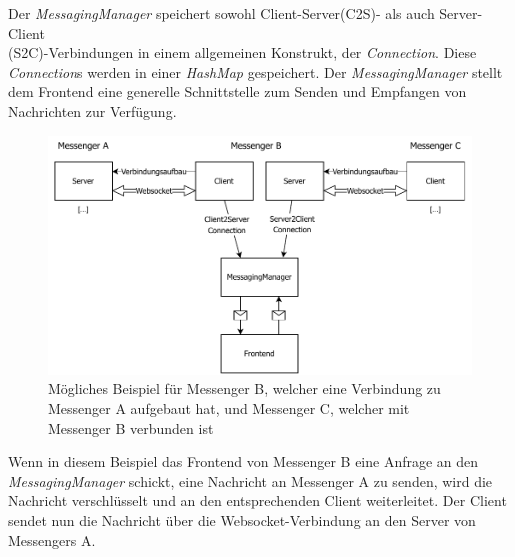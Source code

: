 \documentclass[a4paper,ngerman, headheight=28pt,12pt, footheight=27pt]{scrartcl}
\begin{document}
Der \textit{MessagingManager} speichert sowohl Client-Server(C2S)- als auch Server-Client\\(S2C)-Verbindungen in einem allgemeinen Konstrukt, der \textit{Connection}. Diese \textit{Connection}s werden in einer \textit{HashMap} gespeichert. Der \textit{MessagingManager} stellt dem Frontend eine generelle Schnittstelle zum Senden und Empfangen von Nachrichten zur Verfügung.
\begin{figure}[H]
  \centering
  \includegraphics[width=\textwidth]{diagrams/messaging_messenger.pdf}
  \caption{Mögliches Beispiel für Messenger B, welcher eine Verbindung zu Messenger A aufgebaut hat, und Messenger C, welcher mit Messenger B verbunden ist \label{fig:MessagingMessenger}}
\end{figure}
Wenn in diesem Beispiel das Frontend von Messenger B eine Anfrage an den \textit{MessagingManager} schickt, eine Nachricht an Messenger A zu senden, wird die Nachricht verschlüsselt und an den entsprechenden Client weiterleitet. Der Client sendet nun die Nachricht über die Websocket-Verbindung an den Server von Messengers A.
\end{document}
